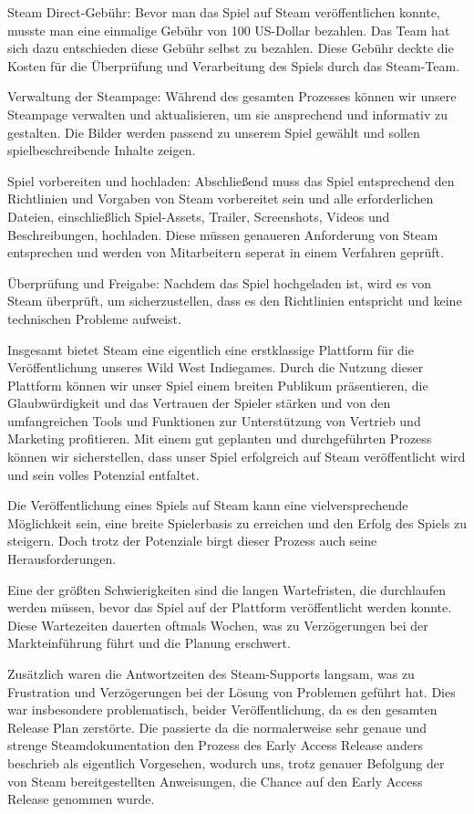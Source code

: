 Steam Direct-Gebühr: Bevor man das Spiel auf Steam veröffentlichen konnte, musste man eine einmalige Gebühr von 100 US-Dollar bezahlen. Das Team hat sich dazu entschieden diese Gebühr selbst zu bezahlen. Diese Gebühr deckte die Kosten für die Überprüfung und Verarbeitung des Spiels durch das Steam-Team.

Verwaltung der Steampage: Während des gesamten Prozesses können wir unsere Steampage verwalten und aktualisieren, um sie ansprechend und informativ zu gestalten. Die Bilder werden passend zu unserem Spiel gewählt und sollen spielbeschreibende Inhalte zeigen.


Spiel vorbereiten und hochladen: Abschließend muss das Spiel entsprechend den Richtlinien und Vorgaben von Steam vorbereitet sein und alle erforderlichen Dateien, einschließlich Spiel-Assets, Trailer, Screenshots, Videos und Beschreibungen, hochladen. Diese müssen genaueren Anforderung von Steam entsprechen und werden von Mitarbeitern seperat in einem Verfahren geprüft.

Überprüfung und Freigabe: Nachdem das Spiel hochgeladen ist, wird es von Steam überprüft, um sicherzustellen, dass es den Richtlinien entspricht und keine technischen Probleme aufweist.

Insgesamt bietet Steam eine eigentlich eine erstklassige Plattform für die Veröffentlichung unseres Wild West Indiegames.
Durch die Nutzung dieser Plattform können wir unser Spiel einem breiten Publikum präsentieren, die Glaubwürdigkeit und das Vertrauen der Spieler stärken und von den
umfangreichen Tools und Funktionen zur Unterstützung von Vertrieb und Marketing profitieren.
Mit einem gut geplanten und durchgeführten Prozess können wir sicherstellen, dass unser Spiel erfolgreich auf Steam veröffentlicht wird und sein volles Potenzial entfaltet.

Die Veröffentlichung eines Spiels auf Steam kann eine vielversprechende Möglichkeit sein, eine breite Spielerbasis zu erreichen und den Erfolg des Spiels zu steigern. Doch trotz der Potenziale birgt dieser Prozess auch seine Herausforderungen.

Eine der größten Schwierigkeiten sind die langen Wartefristen, die durchlaufen werden müssen, bevor das Spiel auf der Plattform veröffentlicht werden konnte. Diese Wartezeiten dauerten oftmals Wochen, was zu Verzögerungen bei der Markteinführung führt und die Planung erschwert.

Zusätzlich waren die Antwortzeiten des Steam-Supports langsam, was zu Frustration und Verzögerungen bei der Lösung von Problemen geführt hat. Dies war insbesondere problematisch, beider Veröffentlichung, da es den gesamten Release Plan zerstörte.
Die passierte da die normalerweise sehr genaue und strenge Steamdokumentation den Prozess des Early Access Release anders beschrieb als eigentlich Vorgesehen, wodurch uns, trotz genauer Befolgung der von Steam bereitgestellten Anweisungen, die Chance auf den Early Access Release genommen wurde.

